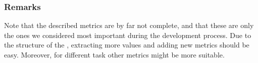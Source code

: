 \subsubsection{Remarks}

Note that the described metrics are by far not complete, and that these are 
only the ones we considered most important during the development process. Due 
to the structure of the \invt, extracting more values and adding new metrics 
should be easy. Moreover, for different task other metrics might be more 
suitable.